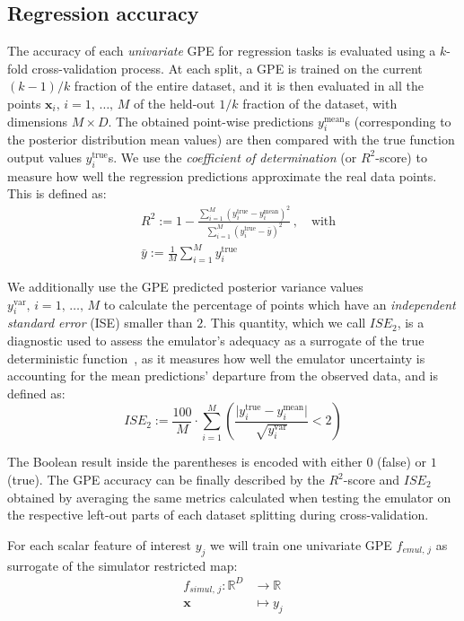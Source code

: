 %
%
%
\subsection{Regression accuracy}\label{sec:ch3regressionaccuracy}
The accuracy of each \textit{univariate} GPE for regression tasks is evaluated using a $k$-fold cross-validation process. At each split, a GPE is trained on the current $(k-1)/k$ fraction of the entire dataset, and it is then evaluated in all the points $\mathbf{x}_i,\,i=1,\,\dots,\,M$ of the held-out $1/k$ fraction of the dataset, with dimensions $M\times D$. The obtained point-wise predictions $y_{i}^{\textrm{mean}}$s (corresponding to the posterior distribution mean values) are then compared with the true function output values $y_{i}^{\textrm{true}}$s. We use the \textit{coefficient of determination} (or $R^2$-score) to measure how well the regression predictions approximate the real data points. This is defined as:
%
\begin{align}
    & R^2 := 1 - \frac{\sum_{i=1}^M(y_{i}^{\textrm{true}}-y_{i}^{\textrm{mean}})^2}{\sum_{i=1}^M(y_{i}^{\textrm{true}} - \bar{y})^2}\,,\quad\text{with} \\
    & \bar{y}:=\frac{1}{M}\sum_{i=1}^M y_{i}^{\textrm{true}}
\end{align}

\noindent
We additionally use the GPE predicted posterior variance values $y_{i}^{\textrm{var}},\,i=1,\,\dots,\,M$ to calculate the percentage of points which have an \textit{independent standard error} (\acs{ISE}) smaller than $2$. This quantity, which we call $ISE_2$, is a diagnostic used to assess the emulator's adequacy as a surrogate of the true deterministic function~\cite{Bastos:2009}, as it measures how well the emulator uncertainty is accounting for the mean predictions' departure from the observed data, and is defined as:
%
\begin{equation}
    ISE_2 := \frac{100}{M}\cdot \sum_{i=1}^M\left(\frac{\vert y_{i}^{\textrm{true}}-y_{i}^{\textrm{mean}}\vert}{\sqrt{y_{i}^{\textrm{var}}}} < 2\right)
\end{equation}

\noindent
The Boolean result inside the parentheses is encoded with either $0$ (false) or $1$ (true). The GPE accuracy can be finally described by the $R^2$-score and $ISE_2$ obtained by averaging the same metrics calculated when testing the emulator on the respective left-out parts of each dataset splitting during cross-validation.

\vspace{0.2cm}
For each scalar feature of interest $y_j$ we will train one univariate GPE $f_{emul,\,j}$ as surrogate of the simulator restricted map:
%
\begin{align}\label{eq:univariatesimulator}
    f_{simul,\,j}\colon\mathbb{R}^{D} &\to \mathbb{R} \\
    \mathbf{x} &\mapsto y_j \nonumber
\end{align}

